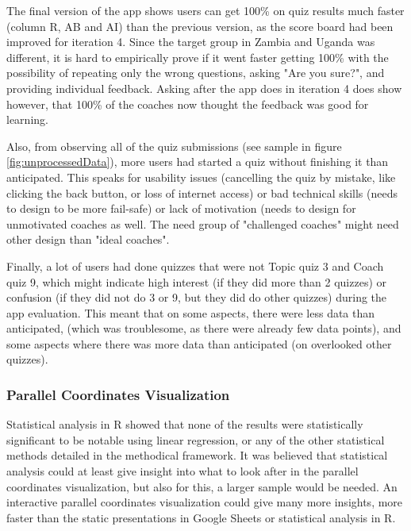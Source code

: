 The final version of the app shows users can get 100\% on quiz results much faster (column R, AB and AI) than the previous version, as the score board had been improved for iteration 4. Since the target group in Zambia and Uganda was different, it is hard to empirically prove if it went faster getting 100\% with the possibility of repeating only the wrong questions, asking "Are you sure?", and providing individual feedback. Asking after the app does in iteration 4 does show however, that 100\% of the coaches now thought the feedback was good for learning.

Also, from observing all of the quiz submissions (see sample in figure \ref{fig:unprocessedData}), more users had started a quiz without finishing it than anticipated. This speaks for usability issues (cancelling the quiz by mistake, like clicking the back button, or loss of internet access) or bad technical skills (needs to design to be more fail-safe) or lack of motivation (needs to design for unmotivated coaches as well. The need group of "challenged coaches" might need other design than "ideal coaches".

Finally, a lot of users had done quizzes that were not Topic quiz 3 and Coach quiz 9, which might indicate high interest (if they did more than 2 quizzes) or confusion (if they did not do 3 or 9, but they did do other quizzes) during the app evaluation. This meant that on some aspects, there were less data than anticipated, (which was troublesome, as there were already few data points), and some aspects where there was more data than anticipated (on overlooked other quizzes).

\subsubsection{Parallel Coordinates Visualization}
Statistical analysis in R showed that none of the results were statistically significant to be notable using linear regression, or any of the other statistical methods detailed in the methodical framework. It was believed that statistical analysis could at least give insight into what to look after in the parallel coordinates visualization, but also for this, a larger sample would be needed. An interactive parallel coordinates visualization could give many more insights, more faster than the static presentations in Google Sheets or statistical analysis in R.

